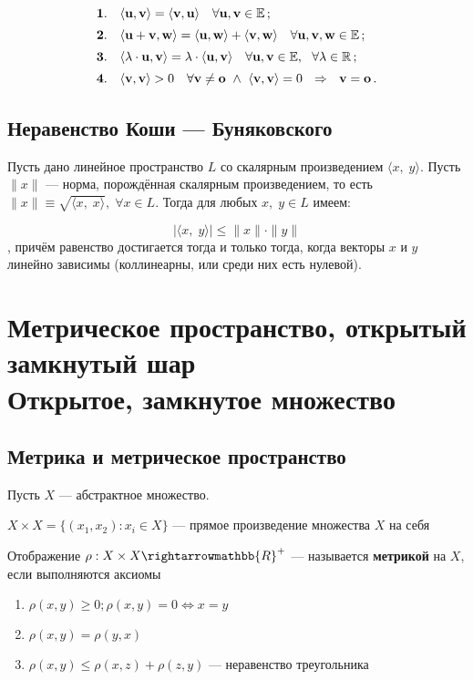 $$\begin{aligned} &\bold{1.}\quad \langle\mathbf{u},\mathbf{v}\rangle= \langle\mathbf{v}, \mathbf{u}\rangle\quad \forall \mathbf{u},\mathbf{v}\in \mathbb{E}\,;\\[2pt] &\bold{2.}\quad \langle\mathbf{u}+\mathbf{v},\mathbf{w}\rangle= \langle\mathbf{u}, \mathbf{w}\rangle+ \langle\mathbf{v},\mathbf{w}\rangle\quad \forall \mathbf{u},\mathbf{v},\mathbf{w}\in \mathbb{E}\,;\\[2pt] &\bold{3.}\quad \langle \lambda\cdot \mathbf{u},\mathbf{v}\rangle= \lambda\cdot \langle\mathbf{u},\mathbf{v}\rangle\quad \forall \mathbf{u},\mathbf{v}\in \mathbb{E},~~ \forall \lambda\in \mathbb{R}\,;\\[2pt] &\bold{4.}\quad \langle\mathbf{v},\mathbf{v}\rangle>0\quad \forall \mathbf{v}\ne \mathbf{o}~\land~ \langle\mathbf{v},\mathbf{v}\rangle=0~~ \Rightarrow~~ \mathbf{v}=\mathbf{o}\,.\end{aligned}$$

\subsection{Неравенство Коши — Буняковского}

Пусть дано линейное пространство $L$ со скалярным произведением $\langle x,\;y\rangle$. Пусть $\|x\|$ — норма, порождённая скалярным произведением, то есть $\|x\|\equiv\sqrt{\langle x,\;x\rangle},\;\forall x\in L$. Тогда для любых $x,\;y\in L$ имеем:

$$|\langle x,\;y\rangle| \leqslant \|x\|\cdot\|y\|$$,
причём равенство достигается тогда и только тогда, когда векторы $x$ и $y$ линейно зависимы (коллинеарны, или среди них есть нулевой).

\section{Метрическое пространство, открытый замкнутый шар\\ {\normalfont Открытое, замкнутое множество}}

\subsection{Метрика и метрическое пространство}

Пусть $X$ — абстрактное множество.

$X \times X=\{(x_1,x_2): x_i \in X\}$ — прямое произведение множества $X$ на себя

Отображение $\rho : X \times X \rightarrowmathbb{R}^{+}$ — называется \textbf{метрикой} на $X$, если выполняются аксиомы
\begin{enumerate}
    \setlength\itemsep{-0.2em}
    \item $\rho(x,y) \geqslant 0; \rho(x,y)=0 \Leftrightarrow x=y$
    \item $\rho(x,y) = \rho(y,x)$
    \item $\rho(x,y)\leqslant\rho(x,z)+\rho(z,y)$ — неравенство треугольника
\end{enumerate}

